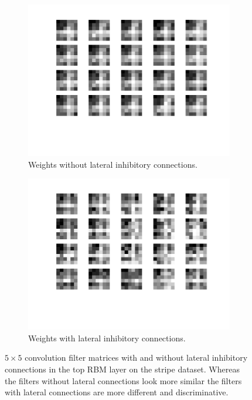\begin{figure}[h!]
	\centering
	\begin{subfigure}[t]{.45\textwidth}
  		\centering
  		\includegraphics[width=.9\linewidth]{imgs/inhib/02129.png}
  		\caption{Weights without lateral inhibitory connections.}
  		\label{fig:sub1}
	\end{subfigure}%
	\begin{subfigure}[t]{.45\textwidth}
  		\centering
  		\includegraphics[width=.9\linewidth]{imgs/inhib/03023.png}
  		\caption{Weights with lateral inhibitory connections.}
  		\label{fig:sub2}
	\end{subfigure}
	\caption{$5 \times 5$ convolution filter matrices with and without lateral inhibitory connections in the top RBM layer on the stripe dataset. Whereas the filters without lateral connections look more similar the filters with lateral connections are more different and discriminative.}
	\label{fig:stripes}
\end{figure}


